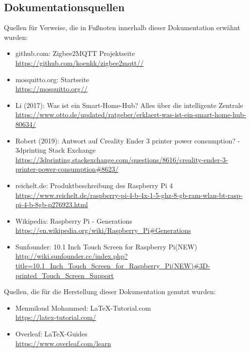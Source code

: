 \subsection{Dokumentationsquellen}\label{qu_doku}
Quellen für Verweise, die in Fußnoten innerhalb dieser Dokumentation erwähnt wurden:
\begin{itemize}
        \item github.com: Zigbee2MQTT Projektseite\\ 
        {\url{https://github.com/koenkk/zigbee2mqtt//}}
        \item mosquitto.org: Startseite\\ 
        {\url{https://mosquitto.org//}}
 		\item Li (2017): Was ist ein Smart-Home-Hub? Alles über die intelligente Zentrale\\ {\url{https://www.otto.de/updated/ratgeber/erklaert-was-ist-ein-smart-home-hub-80634/}}
 		\item Robert (2019): Antwort auf Creality Ender 3 printer power consumption? - 3dprinting Stack Exchange\\ {\url{https://3dprinting.stackexchange.com/questions/8616/creality-ender-3-printer-power-consumption#8623/}}
 		\item reichelt.de: Produktbeschreibung des Raspberry Pi 4\\{\url{https://www.reichelt.de/raspberry-pi-4-b-4x-1-5-ghz-8-gb-ram-wlan-bt-rasp-pi-4-b-8gb-p276923.html}}
 		\item Wikipedia: Raspberry Pi - Generations\\{\url{https://en.wikipedia.org/wiki/Raspberry_Pi#Generations}}
 		\item Sunfounder: 10.1 Inch Touch Screen for Raspberry Pi(NEW)\\{\url{http://wiki.sunfounder.cc/index.php?title=10.1_Inch_Touch_Screen_for_Raspberry_Pi(NEW)#3D-printed_Touch_Screen_Support}}
\end{itemize}
Quellen, die für die Herstellung dieser Dokumentation genutzt wurden:
\begin{itemize}
	\item Menmiloud Mohammed: \LaTeX -Tutorial.com\\{\url{https://latex-tutorial.com/}}
	\item Overleaf: \LaTeX -Guides\\{\url{https://www.overleaf.com/learn}}
\end{itemize}